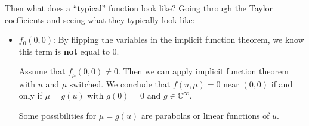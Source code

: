 \documentclass[main.tex]{subfiles}
\begin{document}
Then what does a ``typical'' function look like? Going through the Taylor coefficients and seeing what they typically look like:

\begin{itemize}
    \item $f_0(0, 0)$: By flipping the variables in the implicit function theorem, we know this term is \textbf{not} equal to 0.

    Assume that $f_\mu(0, 0)\neq 0$. Then we can apply implicit function theorem with $u$ and $\mu$ switched. We conclude that $f(u, \mu) = 0$ near $(0, 0)$ if and only if $\mu = g(u)$ with $g(0) = 0$ and $g \in \mathbb{C}^\infty$.

    Some possibilities for $\mu = g(u)$ are parabolas or linear functions of $u$.
\end{itemize}
\end{document}
